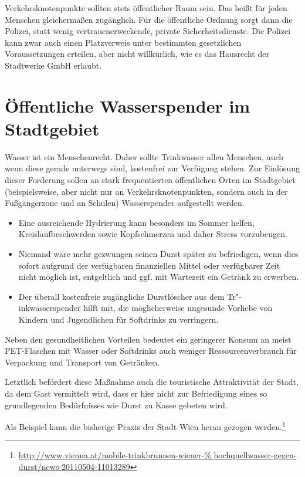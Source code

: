   Verkehrsknotenpunkte sollten stets öffentlicher Raum sein. Das heißt für 
  jeden Menschen gleichermaßen zugänglich. Für die öffentliche Ordnung sorgt 
  dann die Polizei, statt wenig vertrauenerweckende, private
  Sicherheitsdienste. Die Polizei kann zwar auch einen Platzverweis unter 
  bestimmten gesetzlichen Voraussetzungen erteilen, aber nicht willkürlich, 
  wie es das Hausrecht der Stadtwerke GmbH erlaubt.
  
  \section{Öffentliche Wasserspender im Stadtgebiet}
  
  Wasser ist ein Menschenrecht. Daher sollte Trinkwasser allen Menschen, auch 
  wenn diese gerade unterwegs sind, kostenfrei zur Verfügung stehen. Zur 
  Einlösung dieser Forderung sollen an stark frequentierten öffentlichen Orten 
  im Stadtgebiet (beispielsweise, aber nicht nur an Verkehrsknotenpunkten, sondern auch in 
  der Fußgängerzone und an Schulen) Wasserspender aufgestellt werden.
    
  \begin{itemize}
    \item Eine ausreichende Hydrierung kann besonders im Sommer helfen, 
          Kreislaufbeschwerden sowie Kopfschmerzen und daher Stress 
          vorzubeugen.
    \item Niemand wäre mehr gezwungen seinen Durst später zu befriedigen, wenn
          dies sofort aufgrund der verfügbaren finanziellen Mittel oder 
          verfügbarer Zeit nicht möglich ist, entgeltlich und ggf. mit 
          Wartezeit ein Getränk zu erwerben.
    \item Der überall kostenfreie zugängliche Durstlöscher aus dem 
          Tr"-inkwasserspender hilft mit, die möglicherweise ungesunde 
          Vorliebe von Kindern und Jugendlichen für Softdrinks zu verringern. 
  \end{itemize}
  
  Neben den gesundheitlichen Vorteilen bedeutet ein geringerer Konsum an meist 
  PET-Flaschen mit Wasser oder Softdrinks auch weniger Ressourcenverbrauch für 
  Verpackung und Transport von Getränken.
  
  Letztlich befördert diese Maßnahme auch die touristische Attraktivität der 
  Stadt, da dem Gast vermittelt wird, dass er hier nicht zur Befriedigung 
  eines so grundlegenden Bedürfnisses wie Durst zu Kasse gebeten wird.
  
  Als Beispiel kann die bisherige Praxis der Stadt Wien heran gezogen 
  werden.\footnote{\url{http://www.vienna.at/mobile-trinkbrunnen-wiener-%
      hochquellwasser-gegen-durst/news-20110504-11013289}}
